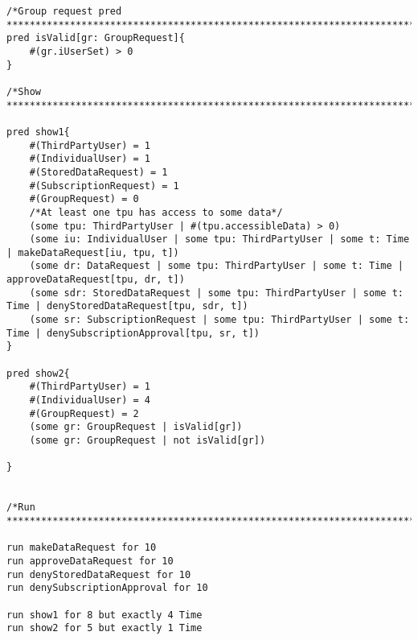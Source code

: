 \begin{lstlisting}
/*Group request pred
***************************************************************************************************************************************/
pred isValid[gr: GroupRequest]{
	#(gr.iUserSet) > 0
}

/*Show
***************************************************************************************************************************************/

pred show1{
 	#(ThirdPartyUser) = 1
	#(IndividualUser) = 1
	#(StoredDataRequest) = 1
	#(SubscriptionRequest) = 1
	#(GroupRequest) = 0
	/*At least one tpu has access to some data*/
	(some tpu: ThirdPartyUser | #(tpu.accessibleData) > 0)
	(some iu: IndividualUser | some tpu: ThirdPartyUser | some t: Time | makeDataRequest[iu, tpu, t])
	(some dr: DataRequest | some tpu: ThirdPartyUser | some t: Time | approveDataRequest[tpu, dr, t])
	(some sdr: StoredDataRequest | some tpu: ThirdPartyUser | some t: Time | denyStoredDataRequest[tpu, sdr, t])
	(some sr: SubscriptionRequest | some tpu: ThirdPartyUser | some t: Time | denySubscriptionApproval[tpu, sr, t])
}

pred show2{
 	#(ThirdPartyUser) = 1
	#(IndividualUser) = 4
	#(GroupRequest) = 2
	(some gr: GroupRequest | isValid[gr])
	(some gr: GroupRequest | not isValid[gr])

}


/*Run
***************************************************************************************************************************************/

run makeDataRequest for 10
run approveDataRequest for 10
run denyStoredDataRequest for 10
run denySubscriptionApproval for 10 

run show1 for 8 but exactly 4 Time
run show2 for 5 but exactly 1 Time
\end{lstlisting}

